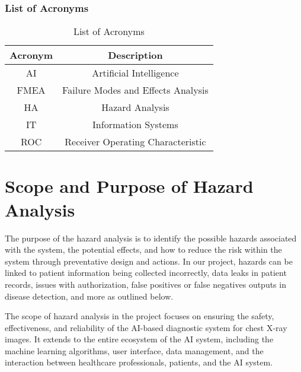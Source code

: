 \documentclass{article}
\begin{document}
    \subsubsection{List of Acronyms}
    \begin{table}[hbt!]
        \centering
        \caption{List of Acronyms}
        \label{ListofAcronyms}
        \begin{tabular}{|c|c|}
        \hline
            Acronym & Description\\
            \hline
            AI  & Artificial Intelligence\\
            FMEA & Failure Modes and Effects Analysis \\
            HA & Hazard Analysis\\
            IT  & Information Systems\\
            ROC & Receiver Operating Characteristic\\
            \hline
        \end{tabular}
    \end{table}

\section{Scope and Purpose of Hazard Analysis}
The purpose of the hazard analysis is to identify the possible hazards associated with the system, the potential effects, and how to reduce the risk within the system through preventative design and actions. In our project, hazards can be linked to patient information being collected incorrectly, data leaks in patient records, issues with authorization, false positives or false negatives outputs in disease detection, and more as outlined below.

The scope of hazard analysis in the project focuses on ensuring the safety, effectiveness, and reliability of the AI-based diagnostic system for chest X-ray images. It extends to the entire ecosystem of the AI system, including the machine learning algorithms, user interface, data management, and the interaction between healthcare professionals, patients, and the AI system.
\end{document}
